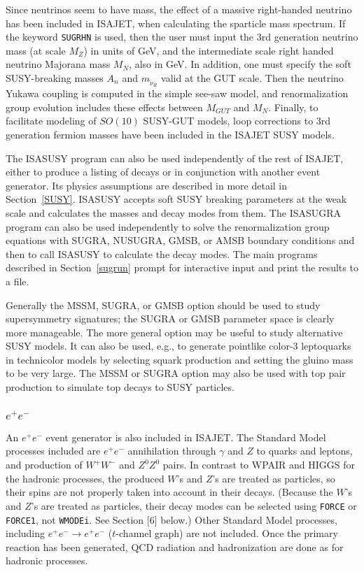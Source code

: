 \medskip

     Since neutrinos seem to have mass, the effect of a massive
right-handed neutrino has been included in ISAJET, when calculating the
sparticle mass spectrum. If the keyword \verb|SUGRHN| is used, then the
user must input the 3rd generation neutrino mass (at scale $M_Z$) in
units of GeV, and the intermediate scale right handed neutrino Majorana
mass $M_N$, also in GeV. In addition, one must specify the soft
SUSY-breaking masses $A_n$ and $m_{\tilde\nu_R}$ valid at the GUT scale.
Then the neutrino Yukawa coupling is computed in the simple see-saw
model, and renormalization group evolution includes these effects
between $M_{GUT}$ and $M_N$. Finally, to facilitate modeling of $SO(10)$
SUSY-GUT models, loop corrections to 3rd generation fermion masses have
been included in the ISAJET SUSY models.

\bigskip\bigskip

      The ISASUSY program can also be used independently of the rest of
ISAJET, either to produce a listing of decays or in conjunction with
another event generator. Its physics assumptions are described in more
detail in Section~\ref{SUSY}. ISASUSY accepts soft SUSY breaking
parameters at the weak scale and calculates the masses and decay modes
from them. The ISASUGRA program can also be used independently to solve
the renormalization group equations with SUGRA, NUSUGRA, GMSB, or AMSB
boundary conditions and then to call ISASUSY to calculate the decay
modes. The main programs described in Section~\ref{sugrun} prompt for
interactive input and print the results to a file.

      Generally the MSSM, SUGRA, or GMSB option should be used to study
supersymmetry signatures; the SUGRA or GMSB parameter space is clearly
more manageable. The more general option may be useful to study
alternative SUSY models. It can also be used, e.g., to generate
pointlike color-3 leptoquarks in technicolor models by selecting squark
production and setting the gluino mass to be very large. The MSSM or
SUGRA option may also be used with top pair production to simulate top
decays to SUSY particles.

\subsubsection{$e^+e^-$} An $e^+e^-$ event generator is also included in
ISAJET. The
Standard Model processes included are $e^+e^-$ annihilation through
$\gamma$ and $Z$ to quarks and leptons, and production of $W^+W^-$ and
$Z^0Z^0$ pairs. In contrast to WPAIR and HIGGS for the hadronic
processes, the produced $W$'s and $Z$'s are treated as particles, so
their spins are not properly taken into account in their decays.
(Because the $W$'s and $Z$'s are treated as particles, their decay
modes can be selected using \verb|FORCE| or \verb|FORCE1|, not
\verb|WMODEi|. See Section [6] below.)  Other Standard Model
processes, including $e^+ e^- \to e^+ e^-$ ($t$-channel graph) 
are not included.  Once the primary reaction has been
generated, QCD radiation and hadronization are done as for hadronic
processes. 

